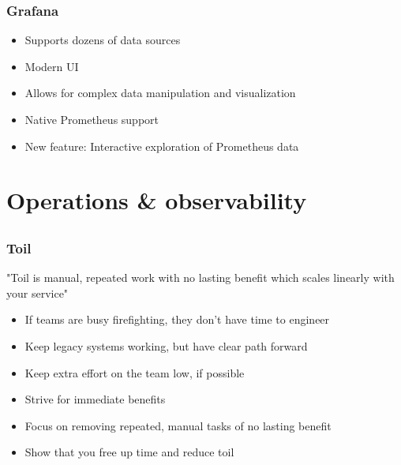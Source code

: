 \documentclass[aspectratio=169]{beamer}
\begin{document}
\begin{frame}
	\frametitle{Grafana}
	\begin{itemize}
		\item Supports dozens of data sources
		\item Modern UI
		\item Allows for complex data manipulation and visualization
		\item Native Prometheus support
		\item New feature: Interactive exploration of Prometheus data
	\end{itemize}
\end{frame}



\section{Operations \& observability}

\subsection{}

\begin{frame}
	\frametitle{Toil}
	"Toil is manual, repeated work with no lasting benefit which scales linearly with your service"
	\vfill
	\begin{itemize}
		\item If teams are busy firefighting, they don't have time to engineer
		\item Keep legacy systems working, but have clear path forward
		\item Keep extra effort on the team low, if possible
		\item Strive for immediate benefits
		\item Focus on removing repeated, manual tasks of no lasting benefit
		\item Show that you free up time and reduce toil
	\end{itemize}
	\vfill
\end{frame}
\end{document}
